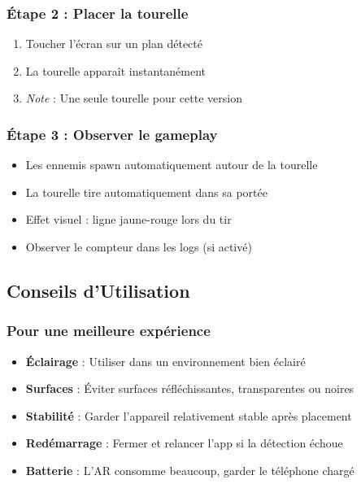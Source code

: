 \documentclass[12pt,a4paper]{article}
\begin{document}
\subsubsection{Étape 2 : Placer la tourelle}
\begin{enumerate}
    \item Toucher l'écran sur un plan détecté
    \item La tourelle apparaît instantanément
    \item \textit{Note} : Une seule tourelle pour cette version
\end{enumerate}

\subsubsection{Étape 3 : Observer le gameplay}
\begin{itemize}
    \item Les ennemis spawn automatiquement autour de la tourelle
    \item La tourelle tire automatiquement dans sa portée
    \item Effet visuel : ligne jaune-rouge lors du tir
    \item Observer le compteur dans les logs (si activé)
\end{itemize}

\subsection{Conseils d'Utilisation}

\subsubsection{Pour une meilleure expérience}
\begin{itemize}[label=$\star$]
    \item \textbf{Éclairage} : Utiliser dans un environnement bien éclairé
    \item \textbf{Surfaces} : Éviter surfaces réfléchissantes, transparentes ou noires
    \item \textbf{Stabilité} : Garder l'appareil relativement stable après placement
    \item \textbf{Redémarrage} : Fermer et relancer l'app si la détection échoue
    \item \textbf{Batterie} : L'AR consomme beaucoup, garder le téléphone chargé
\end{itemize}
\end{document}
